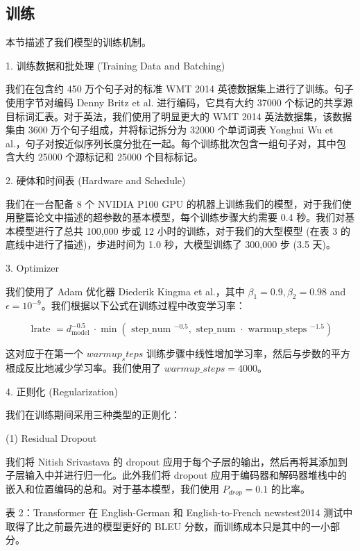 \subsection{训练}

本节描述了我们模型的训练机制。

1. 训练数据和批处理 (Training Data and Batching)

我们在包含约 450 万个句子对的标准 WMT 2014 英德数据集上进行了训练。句子使用字节对编码 Denny Britz et al. 进行编码，它具有大约 37000 个标记的共享源目标词汇表。对于英法，我们使用了明显更大的 WMT 2014 英法数据集，该数据集由 3600 万个句子组成，并将标记拆分为 32000 个单词词表 Yonghui Wu et al.，句子对按近似序列长度分批在一起。每个训练批次包含一组句子对，其中包含大约 25000 个源标记和 25000 个目标标记。

2. 硬体和时间表 (Hardware and Schedule)

我们在一台配备 8 个 NVIDIA P100 GPU 的机器上训练我们的模型，对于我们使用整篇论文中描述的超参数的基本模型，每个训练步骤大约需要 0.4 秒。我们对基本模型进行了总共 100,000 步或 12 小时的训练，对于我们的大型模型 (在表 3 的底线中进行了描述)，步进时间为 1.0 秒，大模型训练了 300,000 步 (3.5 天)。


3. Optimizer

我们使用了 Adam 优化器 Diederik Kingma et al.，其中 $\beta_{1}=0.9, \beta_{2}=0.98$ and $\epsilon=10^{-9}$。我们根据以下公式在训练过程中改变学习率：

\begin{equation}
\text { lrate }=d_{\text {model }}^{-0.5} \cdot \min \left(\text { step\_num }^{-0.5}, \text { step\_num } \cdot \text { warmup\_steps }^{-1.5}\right)
\end{equation}

这对应于在第一个 $warmup_steps$ 训练步骤中线性增加学习率，然后与步数的平方根成反比地减少学习率。我们使用了 $warmup\_steps = 4000$。

4. 正则化 (Regularization)

我们在训练期间采用三种类型的正则化：

(1) Residual Dropout 

我们将 Nitish Srivastava 的 dropout 应用于每个子层的输出，然后再将其添加到子层输入中并进行归一化。此外我们将 dropout 应用于编码器和解码器堆栈中的嵌入和位置编码的总和。对于基本模型，我们使用 $P_{drop} = 0.1$ 的比率。

表 2：Transformer 在 English-German 和 English-to-French newstest2014 测试中取得了比之前最先进的模型更好的 BLEU 分数，而训练成本只是其中的一小部分。

